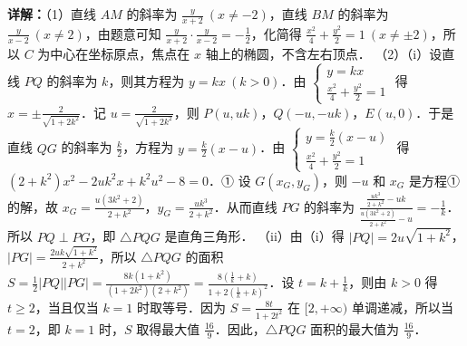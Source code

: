 \begin{question}[points=12]
\begin{solution}
\textbf{详解：}（1）直线 $AM$ 的斜率为 $\frac{y}{x+2}\ (x\neq -2)$，直线 $BM$ 的斜率为 $\frac{y}{x-2}\ (x\neq 2)$，由题意可知 $\frac{y}{x+2}\cdot\frac{y}{x-2}=-\frac{1}{2}$，化简得 $\frac{x^2}{4}+\frac{y^2}{2}=1\ (x\neq\pm 2)$，所以 $C$ 为中心在坐标原点，焦点在 $x$ 轴上的椭圆，不含左右顶点．
（2）（i）设直线 $PQ$ 的斜率为 $k$，则其方程为 $y=kx\ (k>0)$．由 $\begin{cases} y=kx \\ \frac{x^2}{4}+\frac{y^2}{2}=1 \end{cases}$ 得 $x=\pm\frac{2}{\sqrt{1+2k^2}}$．记 $u=\frac{2}{\sqrt{1+2k^2}}$，则 $P(u,uk)$，$Q(-u,-uk)$，$E(u,0)$．于是直线 $QG$ 的斜率为 $\frac{k}{2}$，方程为 $y=\frac{k}{2}(x-u)$．由 $\begin{cases} y=\frac{k}{2}(x-u) \\ \frac{x^2}{4}+\frac{y^2}{2}=1 \end{cases}$ 得 $(2+k^2)x^2-2uk^2x+k^2u^2-8=0$．① 设 $G(x_G,y_G)$，则 $-u$ 和 $x_G$ 是方程①的解，故 $x_G=\frac{u(3k^2+2)}{2+k^2}$，$y_G=\frac{uk^3}{2+k^2}$．从而直线 $PG$ 的斜率为 $\frac{\frac{uk^3}{2+k^2}-uk}{\frac{u(3k^2+2)}{2+k^2}-u}=-\frac{1}{k}$．所以 $PQ\perp PG$，即 $\triangle PQG$ 是直角三角形．
（ii）由（i）得 $|PQ|=2u\sqrt{1+k^2}$，$|PG|=\frac{2uk\sqrt{1+k^2}}{2+k^2}$，所以 $\triangle PQG$ 的面积 $S=\frac{1}{2}|PQ||PG|=\frac{8k(1+k^2)}{(1+2k^2)(2+k^2)}=\frac{8(\frac{1}{k}+k)}{1+2(\frac{1}{k}+k)^2}$．设 $t=k+\frac{1}{k}$，则由 $k>0$ 得 $t\geq 2$，当且仅当 $k=1$ 时取等号．因为 $S=\frac{8t}{1+2t^2}$ 在 $[2,+\infty)$ 单调递减，所以当 $t=2$，即 $k=1$ 时，$S$ 取得最大值 $\frac{16}{9}$．因此，$\triangle PQG$ 面积的最大值为 $\frac{16}{9}$．
\end{solution}
\end{question}

